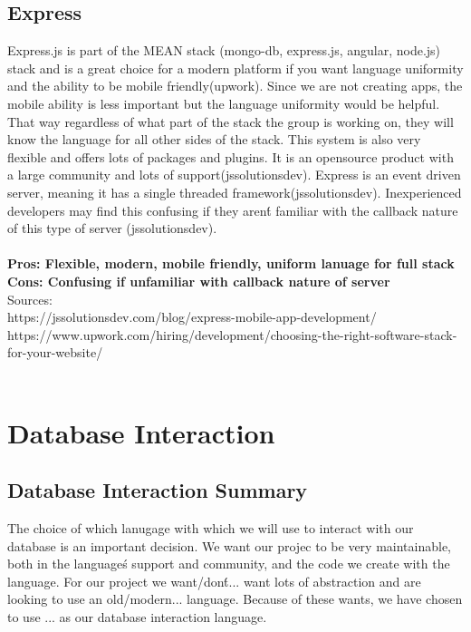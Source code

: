 \documentclass[draftclsnofoot,onecolumn,letterpaper,10pt,compsoc]{IEEEtran}
\begin{document}
	\subsection{Express}
		Express.js is part of the MEAN stack (mongo-db, express.js, angular, node.js) stack and is a great choice for a modern platform if you want language uniformity and the ability to be mobile friendly(upwork).
		Since we are not creating apps, the mobile ability is less important but the language uniformity would be helpful.
		That way regardless of what part of the stack the group is working on, they will know the language for all other sides of the stack.
		This system is also very flexible and offers lots of packages and plugins.
		It is an opensource product with a large community and lots of support(jssolutionsdev).
		Express is an event  driven server, meaning it has a single threaded framework(jssolutionsdev).
		Inexperienced developers may find this confusing if they aren\'t familiar with the callback nature of this type of server (jssolutionsdev).
		\\ \\
		\textbf{Pros: Flexible, modern, mobile friendly, uniform lanuage for full stack}
		\\
		\textbf{Cons: Confusing if unfamiliar with callback nature of server}
		\\
		Sources:\\
		https://jssolutionsdev.com/blog/express-mobile-app-development/ \\
		https://www.upwork.com/hiring/development/choosing-the-right-software-stack-for-your-website/ \\ \\

\section{Database Interaction}
\subsection{Database Interaction Summary}
	The choice of which lanugage with which we will use to interact with our database is an important decision.
	We want our projec to be very maintainable, both in the language\'s support and community, and the code we create with the language.
	For our project we want/don\'t... want lots of abstraction and are looking to use an old/modern... language. Because of these wants, we have chosen to use ... as our database interaction language.
\end{document}
